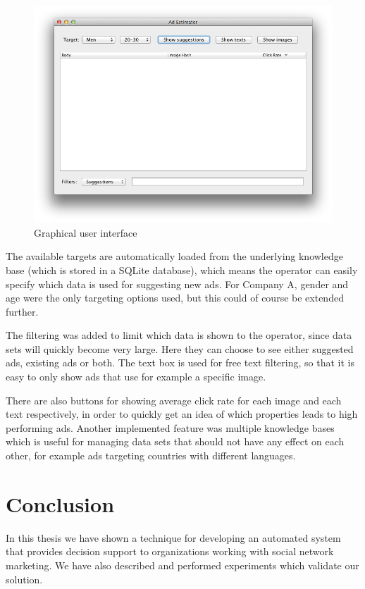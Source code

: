 \documentclass{sig-alternate}
\begin{document}
\begin{figure}[htpb]
    \centering
    \includegraphics[width=\columnwidth]{gui-screenshot.png}
    \caption{Graphical user interface}
    \label{fig:GUI}
\end{figure}

The available targets are automatically loaded from the underlying knowledge base (which is stored in a SQLite database), which means the operator can easily specify which data is used for suggesting new ads. For Company A, gender and age were the only targeting options used, but this could of course be extended further.

The filtering was added to limit which data is shown to the operator, since data sets will quickly become very large. Here they can choose to see either suggested ads, existing ads or both. The text box is used for free text filtering, so that it is easy to only show ads that use for example a specific image.

There are also buttons for showing average click rate for each image and each text respectively, in order to quickly get an idea of which properties leads to high performing ads. Another implemented feature was multiple knowledge bases which is useful for managing data sets that should not have any effect on each other, for example ads targeting countries with different languages.

\section{Conclusion}
\label{ch:Conclusion}
In this thesis we have shown a technique for developing an automated system that provides decision support to organizations working with social network marketing. We have also described and performed experiments which validate our solution.
\end{document}
